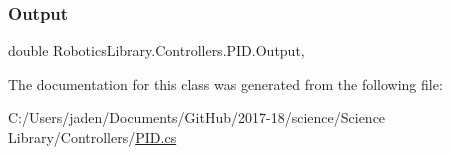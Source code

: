 \subsubsection{\texorpdfstring{Output}{Output}}
{\footnotesize\ttfamily double Robotics\+Library.\+Controllers.\+P\+I\+D.\+Output\hspace{0.3cm}{\ttfamily [get]}, {}}



The documentation for this class was generated from the following file\+:\begin{DoxyCompactItemize}
\item 
C\+:/\+Users/jaden/\+Documents/\+Git\+Hub/2017-\/18/science/\+Science Library/\+Controllers/\hyperlink{_p_i_d_8cs}{P\+I\+D.\+cs}\end{DoxyCompactItemize}
